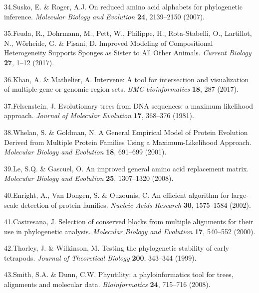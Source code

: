 \documentclass[]{article}
\begin{document}
\leavevmode\hypertarget{ref-Susko:2007ds}{}%
34.Susko, E. \& Roger, A.J. On reduced amino acid alphabets for
phylogenetic inference. \emph{Molecular Biology and Evolution}
\textbf{24}, 2139--2150 (2007).

\leavevmode\hypertarget{ref-Feuda:2017ew}{}%
35.Feuda, R., Dohrmann, M., Pett, W., Philippe, H., Rota-Stabelli, O.,
Lartillot, N., Wörheide, G. \& Pisani, D. Improved Modeling of
Compositional Heterogeneity Supports Sponges as Sister to All Other
Animals. \emph{Current Biology} \textbf{27}, 1--12 (2017).

\leavevmode\hypertarget{ref-khan2017intervene}{}%
36.Khan, A. \& Mathelier, A. Intervene: A tool for intersection and
visualization of multiple gene or genomic region sets. \emph{BMC
bioinformatics} \textbf{18}, 287 (2017).

\leavevmode\hypertarget{ref-Felsenstein:1981vk}{}%
37.Felsenstein, J. Evolutionary trees from DNA sequences: a maximum
likelihood approach. \emph{Journal of Molecular Evolution} \textbf{17},
368--376 (1981).

\leavevmode\hypertarget{ref-Whelan:2001ds}{}%
38.Whelan, S. \& Goldman, N. A General Empirical Model of Protein
Evolution Derived from Multiple Protein Families Using a
Maximum-Likelihood Approach. \emph{Molecular Biology and Evolution}
\textbf{18}, 691--699 (2001).

\leavevmode\hypertarget{ref-Le:2008fp}{}%
39.Le, S.Q. \& Gascuel, O. An improved general amino acid replacement
matrix. \emph{Molecular Biology and Evolution} \textbf{25}, 1307--1320
(2008).

\leavevmode\hypertarget{ref-Enright:2002uq}{}%
40.Enright, A., Van Dongen, S. \& Ouzounis, C. An efficient algorithm
for large-scale detection of protein families. \emph{Nucleic Acids
Research} \textbf{30}, 1575--1584 (2002).

\leavevmode\hypertarget{ref-Castresana:2000vy}{}%
41.Castresana, J. Selection of conserved blocks from multiple alignments
for their use in phylogenetic analysis. \emph{Molecular Biology and
Evolution} \textbf{17}, 540--552 (2000).

\leavevmode\hypertarget{ref-Thorley:1999kg}{}%
42.Thorley, J. \& Wilkinson, M. Testing the phylogenetic stability of
early tetrapods. \emph{Journal of Theoretical Biology} \textbf{200},
343--344 (1999).

\leavevmode\hypertarget{ref-Smith:2008gb}{}%
43.Smith, S.A. \& Dunn, C.W. Phyutility: a phyloinformatics tool for
trees, alignments and molecular data. \emph{Bioinformatics} \textbf{24},
715--716 (2008).
\end{document}

